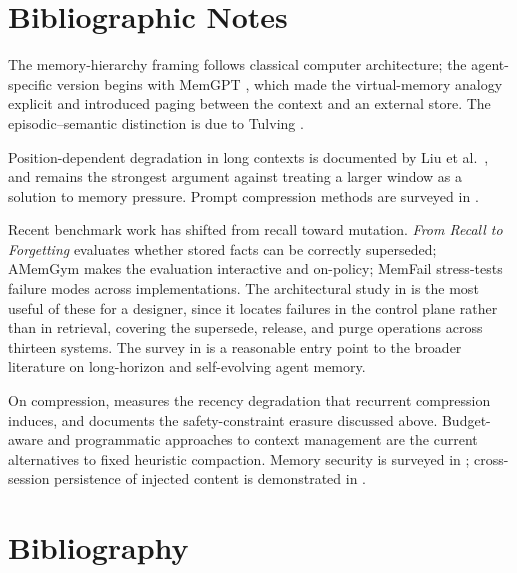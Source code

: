 \documentclass[11pt]{book}
\begin{document}
\section*{Bibliographic Notes}

The memory-hierarchy framing follows classical computer architecture; the agent-specific version begins with MemGPT \cite{packer2023memgpt}, which made the virtual-memory analogy explicit and introduced paging between the context and an external store. The episodic--semantic distinction is due to Tulving \cite{tulving1972episodic}.

Position-dependent degradation in long contexts is documented by Liu et al.\ \cite{liu2024lost}, and remains the strongest argument against treating a larger window as a solution to memory pressure. Prompt compression methods are surveyed in \cite{compression_survey_2025}.

Recent benchmark work has shifted from recall toward mutation. \emph{From Recall to Forgetting} \cite{recallforget2026} evaluates whether stored facts can be correctly superseded; AMemGym \cite{amemgym2026} makes the evaluation interactive and on-policy; MemFail \cite{memfail2026} stress-tests failure modes across implementations. The architectural study in \cite{controlplane2026} is the most useful of these for a designer, since it locates failures in the control plane rather than in retrieval, covering the supersede, release, and purge operations across thirteen systems. The survey in \cite{memsurvey2026} is a reasonable entry point to the broader literature on long-horizon and self-evolving agent memory.

On compression, \cite{compressreliab2026} measures the recency degradation that recurrent compression induces, and \cite{govdecay2026} documents the safety-constraint erasure discussed above. Budget-aware \cite{contextbudget2026} and programmatic \cite{contextenv2026, acmgmt2026} approaches to context management are the current alternatives to fixed heuristic compaction. Memory security is surveyed in \cite{memsec2026}; cross-session persistence of injected content is demonstrated in \cite{crosssession2026}.

\section*{Bibliography}
\end{document}
